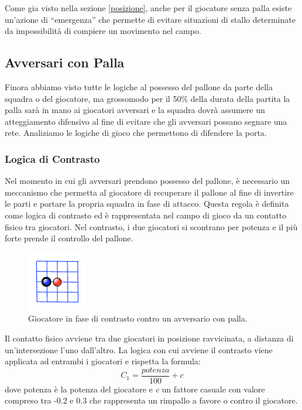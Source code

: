 \documentclass[aps,letterpaper,10pt]{article}
\begin{document}
Come gia visto nella sezione \ref{posizione}, anche per il giocatore senza palla esiste un'azione di ``emergenza'' che permette di evitare situazioni di stallo determinate da impossibilit\`a di compiere un movimento nel campo.

\subsection{Avversari con Palla}

Finora abbiamo visto tutte le logiche al possesso del pallone da parte della squadra o del giocatore, ma grossomodo per il 50\% della durata della partita la palla sar\`a in mano ai giocatori avversari e la squadra dovr\`a assumere un atteggiamento difensivo al fine di evitare che gli avversari possano segnare una rete. Analiziamo le logiche di gioco che permettono di difendere la porta.

\subsubsection{Logica di Contrasto}
\label{scontro}

Nel momento in cui gli avversari prendono possesso del pallone, \`e necessario un meccanismo che permetta al giocatore di recuperare il pallone al fine di invertire le parti e portare la propria squadra in fase di attacco. Questa regola \`e definita come logica di contrasto ed \`e rappresentata nel campo di gioco da un contatto fisico tra giocatori. Nel contrasto, i due giocatori si scontrano per potenza e il pi\`u forte prende il controllo del pallone. \vspace{3mm}

\begin{figure}[H]
	\begin{center}
		\includegraphics[width=100px]{images/contrast.pdf}
	\end{center}
\caption{Giocatore in fase di contrasto contro un avversario con palla.}
\end{figure}

Il contatto fisico avviene tra due giocatori in posizione ravvicinata, a distanza di un'intersezione l'uno dall'altro. La logica con cui avviene il contrasto viene applicata ad entrambi i giocatori e rispetta la formula: $$ C_1 = \frac{potenza}{100} + c $$ dove potenza \`e la potenza del giocatore e \emph{c} un fattore casuale con valore compreso tra -0.2 e 0.3 che rappresenta un rimpallo a favore o contro il giocatore. \vspace{3mm}
\end{document}
